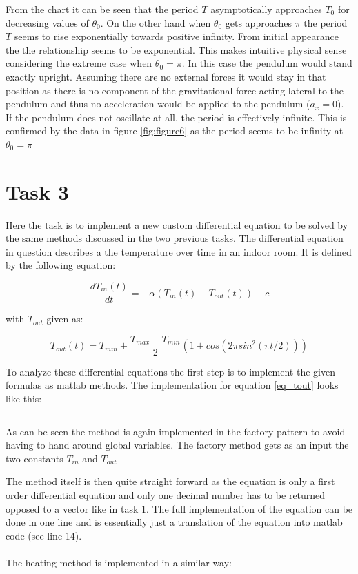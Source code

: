 \documentclass[14pt]{article}
\begin{document}
From the chart it can be seen that the period $T$ asymptotically approaches $T_0$ for decreasing values of $\theta_0$. 
On the other hand when $\theta_0$ gets approaches $\pi$ the period $T$ seems to rise exponentially
towards positive infinity. From initial appearance the the relationship seems to be exponential. This makes intuitive physical sense
considering the extreme case when $\theta_0 = \pi$. In this case the pendulum would stand exactly upright. Assuming there are
no external forces it would stay in that position as there is no component of the gravitational force acting lateral to the pendulum
and thus no acceleration would be applied to the pendulum ($a_x = 0$). If the pendulum does not oscillate at all, the period is effectively infinite.
This is confirmed by the data in figure \ref{fig:figure6} as the period seems to be infinity at $\theta_0 = \pi$

\section{Task 3}

Here the task is to implement a new custom differential equation to be solved by the same methods discussed in the two
previous tasks. The differential equation in question describes a the temperature over time in an indoor room. It is
defined by the following equation:

\begin{equation}\label{eq_heating}
  \frac{d T_{in}(t)}{dt} = - \alpha(T_{in}(t) - T_{out}(t)) + c
\end{equation}

with $ T_{out} $ given as:

\begin{equation}\label{eq_tout}
  T_{out}(t) = T_{min} + \frac{T_{max} - T_{min}}{2}(1 + cos(2 \pi sin^2(\pi t/2)))
\end{equation}

To analyze these differential equations the first step is to implement the given formulas as matlab methods. The implementation for
equation \ref{eq_tout} looks like this:

\inputminted[linenos]{octave}{./matlab/make_Tout.m}

As can be seen the method is again implemented in the factory pattern to avoid having to hand around global variables.
The factory method gets as an input the two constants $T_{in}$ and $T_{out}$

The method itself is then quite straight forward as the equation is only a first order differential equation and
only one decimal number has to be returned opposed to a vector like in task 1. The full implementation of the 
equation can be done in one line and is essentially just a translation of the equation into matlab code (see line 14).\\
\\
The heating method is implemented in a similar way:
\end{document}
